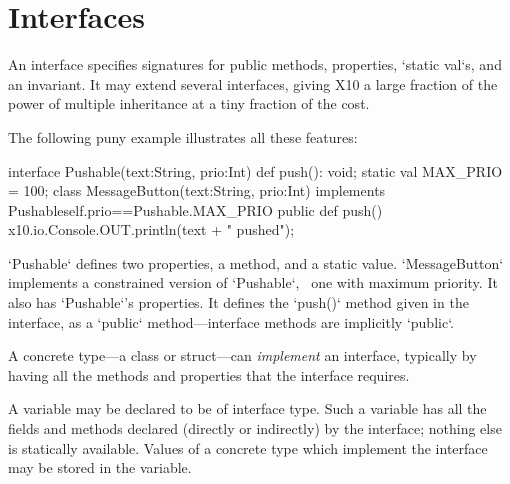 \chapter{Interfaces}
\label{XtenInterfaces}

An interface specifies signatures for public methods, properties,
\xcd`static val`s, and an invariant. It may extend several interfaces, giving
X10 a large fraction of the power of multiple inheritance at a tiny fraction
of the cost.

The following puny example illustrates all these features: 
%
\begin{xten}
interface Pushable(text:String, prio:Int) {
  def push(): void;
  static val MAX_PRIO = 100;
}
class MessageButton(text:String, prio:Int) 
  implements Pushable{self.prio==Pushable.MAX_PRIO} {
  public def push() { 
    x10.io.Console.OUT.println(text + " pushed");
  }
}
\end{xten}
%
\noindent
\xcd`Pushable` defines two properties, a method, and a static value.  
\xcd`MessageButton` implements a constrained version of \xcd`Pushable`,
\viz\ one with maximum priority.  It also has \xcd`Pushable`'s properties.  It
defines the \xcd`push()` method given in the interface, as a \xcd`public`
method---interface methods are implicitly \xcd`public`.

A concrete type---a class or struct---can {\em implement} an interface,
typically by having all the methods and properties that the interface
requires.

A variable may be declared to be of interface type.  Such a variable has all
the fields and methods declared (directly or indirectly) by the interface;
nothing else is statically available.  Values of a concrete type which
implement the interface may be stored in the variable.  


\label{DepType:Interface}

